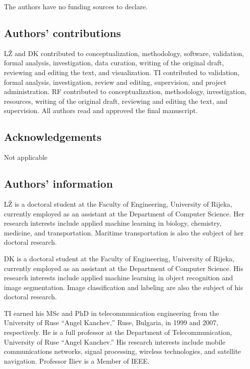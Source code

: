 \documentclass[sn-mathphys-num]{sn-jnl}%
\begin{document}
The authors have no funding sources to declare.

\subsection{Authors' contributions}

L\v{Z} and DK contributed to conceptualization, methodology, software, validation, formal analysis, investigation, data curation, writing of the original draft, reviewing and editing the text, and visualization. TI contributed to validation, formal analysis, investigation, review and editing, supervision, and project administration. RF contributed to conceptualization, methodology, investigation, resources, writing of the original draft, reviewing and editing the text, and supervision. All authors read and approved the final manuscript.

\subsection{Acknowledgements}

Not applicable

\subsection{Authors' information}

LŽ is a doctoral student at the Faculty of Engineering, University of Rijeka, currently employed as an assistant at the Department of Computer Science. Her research interests include applied machine learning in biology, chemistry, medicine, and transportation. Maritime transportation is also the subject of her doctoral research.

DK is a doctoral student at the Faculty of Engineering, University of Rijeka, currently employed as an assistant at the Department of Computer Science. His research interests include applied machine learning in object recognition and image segmentation. Image classification and labeling are also the subject of his doctoral research.

TI earned his MSc and PhD in telecommunication engineering from the University of Ruse “Angel Kanchev,” Ruse, Bulgaria, in 1999 and 2007, respectively. He is a full professor at the Department of Telecommunication, University of Ruse “Angel Kanchev.” His research interests include mobile communications networks, signal processing, wireless technologies, and satellite navigation. Professor Iliev is a Member of IEEE.
\end{document}
